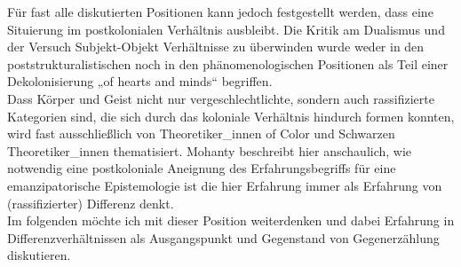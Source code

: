 \noindent Für fast alle diskutierten Positionen kann jedoch festgestellt werden, dass
eine Situierung im postkolonialen Verhältnis ausbleibt. Die Kritik am Dualismus
und der Versuch Subjekt-Objekt Verhältnisse zu überwinden wurde weder in den
poststrukturalistischen noch in den phänomenologischen Positionen als Teil
einer Dekolonisierung „of hearts and minds“  begriffen.\\
Dass Körper und Geist
nicht nur vergeschlechtlichte, sondern auch rassifizierte Kategorien sind, die
sich durch das koloniale Verhältnis hindurch formen konnten, wird fast ausschließlich von Theoretiker\_innen of Color und Schwarzen Theoretiker\_innen thematisiert. Mohanty beschreibt hier
anschaulich, wie notwendig eine postkoloniale Aneignung des Erfahrungsbegriffs
für eine emanzipatorische Epistemologie ist die hier Erfahrung immer als
Erfahrung von (rassifizierter) Differenz denkt.\\

\noindent Im folgenden möchte ich mit dieser Position weiterdenken und dabei Erfahrung in
Differenzverhältnissen als Ausgangspunkt und Gegenstand von Gegenerzählung diskutieren.

